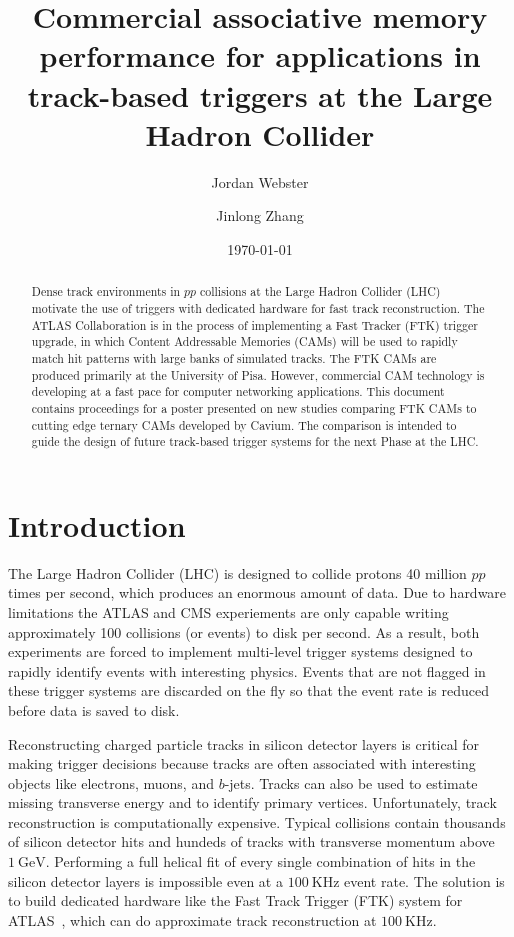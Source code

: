 \documentclass[preprint,prd,showpacs]{revtex4-1}
\newcommand{\gev}{~\mathrm{GeV}}
\newcommand{\khz}{~\mathrm{KHz}}
\begin{document}
\title{Commercial associative memory performance for applications in track-based triggers at the Large Hadron Collider}
\author{Jordan Webster}
\author{Jinlong Zhang}

\date{\today}
\begin{abstract}
  Dense track environments in $pp$ collisions at the Large Hadron Collider (LHC) motivate the use of triggers with dedicated hardware for fast track reconstruction. The ATLAS Collaboration is in the process of implementing a Fast Tracker (FTK) trigger upgrade, in which Content Addressable Memories (CAMs) will be used to rapidly match hit patterns with large banks of simulated tracks. The FTK CAMs are produced primarily at the University of Pisa. However, commercial CAM technology is developing at a fast pace for computer networking applications. This document contains proceedings for a poster presented on new studies comparing FTK CAMs to cutting edge ternary CAMs developed by Cavium. The comparison is intended to guide the design of future track-based trigger systems for the next Phase at the LHC.
\end{abstract}

\maketitle

\section{Introduction}\label{sec:Introduction}

The Large Hadron Collider (LHC) is designed to collide protons 40 million $pp$ times per second, which produces an enormous amount of data. Due to hardware limitations the ATLAS and CMS experiements are only capable writing approximately 100 collisions (or events) to disk per second. As a result, both experiments are forced to implement multi-level trigger systems designed to rapidly identify events with interesting physics. Events that are not flagged in these trigger systems are discarded on the fly so that the event rate is reduced before data is saved to disk.

Reconstructing charged particle tracks in silicon detector layers is critical for making trigger decisions because tracks are often associated with interesting objects like electrons, muons, and $b$-jets. Tracks can also be used to estimate missing transverse energy and to identify primary vertices. Unfortunately, track reconstruction is computationally expensive. Typical collisions contain thousands of silicon detector hits and hundeds of tracks with transverse momentum above $1\gev$. Performing a full helical fit of every single combination of hits in the silicon detector layers is impossible even at a $100\khz$ event rate. The solution is to build dedicated hardware like the Fast Track Trigger (FTK) system for ATLAS~\cite{Shochet:1552953}, which can do approximate track reconstruction at $100\khz$.
\end{document}
